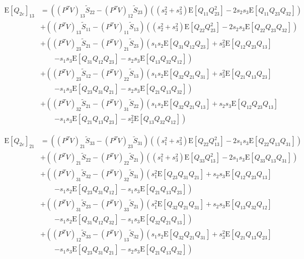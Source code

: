 \documentclass[10pt]{article}
\newcommand{\expect}[1]{\ensuremath{\mathrm{E}\left[ #1 \right]}}
\begin{document}
\begin{align}
	\expect{Q_{2e}}_{13} &= \left( (P^TV)_{13}\tilde{S}_{22} - (P^TV)_{12}\tilde{S}_{23} \right)\left( (s_2^2+s_3^2)\expect{Q_{11}Q_{23}^2} - 2s_2s_3\expect{Q_{11}Q_{23}Q_{32}} \right) \nonumber \\
	&+ \left( (P^TV)_{13}\tilde{S}_{11} - (P^TV)_{11}\tilde{S}_{13} \right)\left( (s_2^2+s_3^2)\expect{Q_{22}Q_{23}^2} - 2s_2s_3\expect{Q_{22}Q_{23}Q_{32}} \right) \nonumber \\
	&+ \left( (P^TV)_{23}\tilde{S}_{21} - (P^TV)_{21}\tilde{S}_{23} \right)\left( s_1s_2\expect{Q_{31}Q_{12}Q_{23}} + s_3^2\expect{Q_{12}Q_{23}Q_{13}} \right. \nonumber \\ &\qquad \left. - s_1s_3\expect{Q_{31}Q_{12}Q_{23}} - s_2s_3\expect{Q_{13}Q_{32}Q_{12}} \right) \nonumber \\
	&+ \left( (P^TV)_{23}\tilde{S}_{12} - (P^TV)_{22}\tilde{S}_{13} \right)\left( s_1s_2\expect{Q_{32}Q_{21}Q_{31}} + s_3^2\expect{Q_{21}Q_{13}Q_{23}} \right. \nonumber \\ &\qquad \left. - s_1s_3\expect{Q_{23}Q_{31}Q_{21}} - s_2s_3\expect{Q_{21}Q_{13}Q_{32}} \right) \nonumber \\
	&+ \left( (P^TV)_{32}\tilde{S}_{21} - (P^TV)_{31}\tilde{S}_{22} \right)\left( s_1s_2\expect{Q_{32}Q_{21}Q_{13}} + s_2s_3\expect{Q_{12}Q_{23}Q_{13}} \right. \nonumber \\ &\qquad \left. - s_1s_3\expect{Q_{21}Q_{13}Q_{23}} - s_2^2\expect{Q_{13}Q_{32}Q_{12}} \right)
\end{align}

\begin{align}
	\expect{Q_{2e}}_{21} &= \left( (P^TV)_{21}\tilde{S}_{33} - (P^TV)_{23}\tilde{S}_{31} \right)\left( (s_1^2+s_3^2)\expect{Q_{22}Q_{13}^2} - 2s_1s_3\expect{Q_{22}Q_{13}Q_{31}} \right) \nonumber \\
	&+ \left( (P^TV)_{21}\tilde{S}_{22} - (P^TV)_{22}\tilde{S}_{21} \right)\left( (s_1^2+s_3^2)\expect{Q_{33}Q_{13}^2} - 2s_1s_3\expect{Q_{33}Q_{13}Q_{31}} \right) \nonumber \\
	&+ \left( (P^TV)_{31}\tilde{S}_{32} - (P^TV)_{32}\tilde{S}_{31} \right)\left( s_1^2\expect{Q_{23}Q_{31}Q_{21}} + s_2s_3\expect{Q_{12}Q_{23}Q_{13}} \right. \nonumber \\ &\qquad \left. - s_1s_2\expect{Q_{23}Q_{31}Q_{12}} - s_1s_3\expect{Q_{21}Q_{13}Q_{23}} \right) \nonumber \\
	&+ \left( (P^TV)_{31}\tilde{S}_{23} - (P^TV)_{33}\tilde{S}_{21} \right)\left( s_1^2\expect{Q_{32}Q_{21}Q_{31}} + s_2s_3\expect{Q_{13}Q_{32}Q_{12}} \right. \nonumber \\ &\qquad \left. - s_1s_2\expect{Q_{31}Q_{12}Q_{32}} - s_1s_3\expect{Q_{32}Q_{21}Q_{13}} \right) \nonumber \\
	&+ \left( (P^TV)_{12}\tilde{S}_{33} - (P^TV)_{13}\tilde{S}_{32} \right)\left( s_1s_2\expect{Q_{32}Q_{21}Q_{31}} + s_3^2\expect{Q_{21}Q_{13}Q_{23}} \right. \nonumber \\ &\qquad \left. - s_1s_3\expect{Q_{23}Q_{31}Q_{21}} - s_2s_3\expect{Q_{21}Q_{13}Q_{32}} \right)
\end{align}
\end{document}
